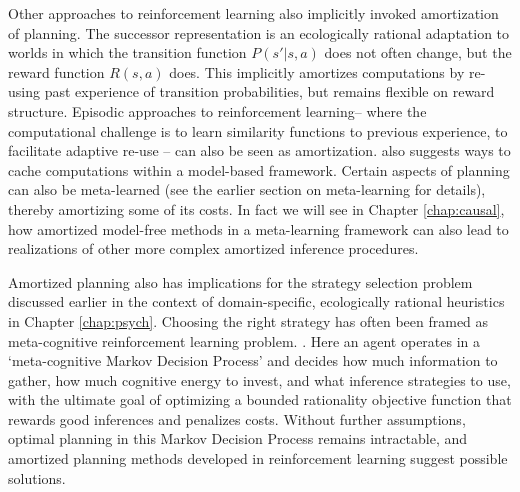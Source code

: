 Other approaches to reinforcement learning also implicitly invoked amortization of planning. The successor representation\citep{dayan1993improving} is an ecologically rational adaptation to worlds in which the transition function $P(s' | s, a)$ does not often change, but the reward function $R(s, a)$ does. This implicitly amortizes computations by re-using past experience of transition probabilities, but remains flexible on reward structure. Episodic approaches to reinforcement learning-- where the computational challenge is to learn similarity functions to previous experience, to facilitate adaptive re-use\citep{gershman2017reinforcement} -- can also be seen as amortization.  \citet{keramati2016adaptive} also suggests ways to cache computations within a model-based framework. Certain aspects of planning can also be meta-learned (see the earlier section on meta-learning for details), thereby amortizing some of its costs\citep{botvinick2019reinforcement}. In fact we will see in Chapter \ref{chap:causal}, how amortized model-free methods in a meta-learning framework can also lead to realizations of other more complex amortized inference procedures.

Amortized planning also has implications for the strategy selection problem discussed earlier in the context of domain-specific, ecologically rational heuristics in Chapter \ref{chap:psych}. Choosing the right strategy has often been framed as meta-cognitive reinforcement learning problem. \cite{erev2005adaptation, rieskamp2006ssl, lieder2017strategy}. Here an agent operates in a `meta-cognitive Markov Decision Process' and decides how much information to gather, how much cognitive energy to invest, and what inference strategies to use, with the ultimate goal of optimizing a bounded rationality objective function that rewards good inferences and penalizes costs. Without further assumptions, optimal planning in this Markov Decision Process remains intractable, and amortized planning methods developed in reinforcement learning suggest possible solutions.


